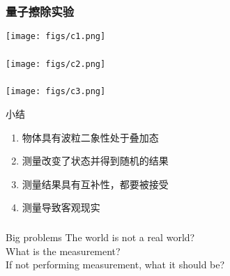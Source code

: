  \begin{frame}
     \frametitle{量子擦除实验}
     \begin{center}
         \texttt{[image: figs/c1.png]} \\
     \end{center} 
 \end{frame}
 
 \begin{frame}
     \frametitle{}
     \begin{center}
         \texttt{[image: figs/c2.png]} \\
     \end{center} 
 \end{frame}
 
 \begin{frame}
     \frametitle{}
     \begin{center}
         \texttt{[image: figs/c3.png]} \\
     \end{center} 
 \end{frame}
 
 \begin{frame}
     \begin{atcbox}{小结}
         ~~\\
     \begin{enumerate}
          \item 物体具有波粒二象性处于叠加态
          \item 测量改变了状态并得到随机的结果
          \item 测量结果具有互补性，都要被接受
          \item 测量导致客观现实
     \end{enumerate}
     \end{atcbox}
 \end{frame}
 
 \begin{frame}
     \frametitle{}
     \begin{atcbox}{Big problems}
        {
        \large  {The world is not a real world?\\
        What is the measurement? \\
        If not performing measurement, what it should be?}}
     \end{atcbox}
 \end{frame}
 
